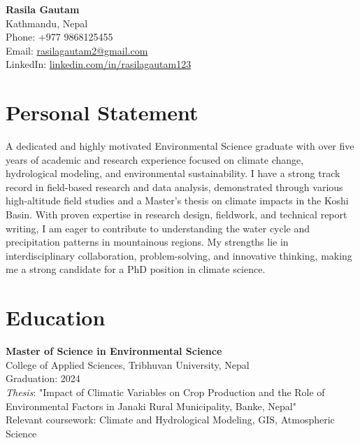 \documentclass[a4paper,10pt]{article}
\begin{document}
\begin{center}
    {\LARGE \textbf{Rasila Gautam}} \\
    Kathmandu, Nepal \\
    Phone: +977 9868125455 \\
    Email: \href{mailto:rasilagautam2@gmail.com}{rasilagautam2@gmail.com} \\
    LinkedIn: \href{https://linkedin.com/in/rasilagautam123}{linkedin.com/in/rasilagautam123}
\end{center}

\vspace{0.3cm}

\section*{Personal Statement}
A dedicated and highly motivated Environmental Science graduate with over five years of academic and research experience focused on climate change, hydrological modeling, and environmental sustainability. I have a strong track record in field-based research and data analysis, demonstrated through various high-altitude field studies and a Master's thesis on climate impacts in the Koshi Basin. With proven expertise in research design, fieldwork, and technical report writing, I am eager to contribute to understanding the water cycle and precipitation patterns in mountainous regions. My strengths lie in interdisciplinary collaboration, problem-solving, and innovative thinking, making me a strong candidate for a PhD position in climate science.

\vspace{0.3cm}

\section*{Education}
\noindent
\textbf{Master of Science in Environmental Science} \\
College of Applied Sciences, Tribhuvan University, Nepal \\
Graduation: 2024 \\
\textit{Thesis}: "Impact of Climatic Variables on Crop Production and the Role of Environmental Factors in Janaki Rural Municipality, Banke, Nepal" \\
Relevant coursework: Climate and Hydrological Modeling, GIS, Atmospheric Science

\vspace{0.2cm}
\end{document}
